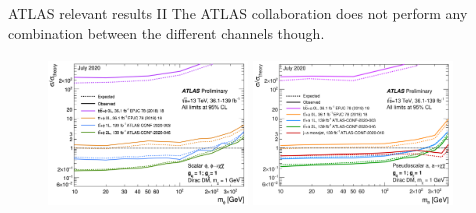 \documentclass[8pt]{beamer}
\begin{document}
\begin{frame}{ATLAS relevant results II}
\justifying
The ATLAS collaboration does not perform any combination between the different channels though. \vfill

\begin{figure}[htbp]
\centering
\begin{minipage}[b]{.5\textwidth}
\includegraphics[width=5.3cm, height=4cm]{figs/ATLASttDM_scalar.png}
\end{minipage}\hfill
\begin{minipage}[b]{.5\textwidth}
\includegraphics[width=5.3cm, height=4cm]{figs/ATLASttDM_pseudoscalar.png}
\end{minipage}\hfill
\end{figure} \vfill
\end{frame}
\end{document}
